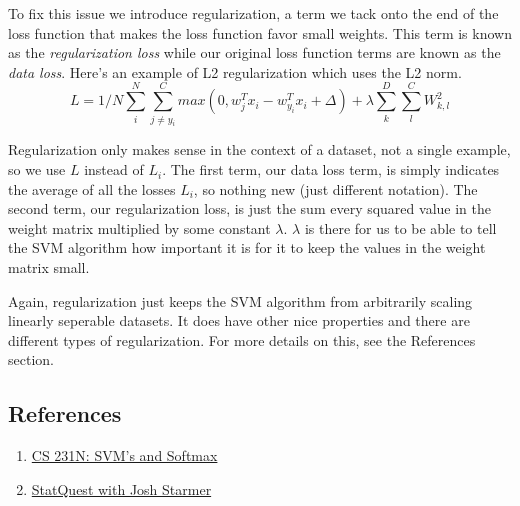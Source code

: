 \documentclass[12pt]{article}
\begin{document}
To fix this issue we introduce regularization, a term we tack onto the end of the loss function
that makes the loss function favor small weights. This term is known as the \emph{regularization 
loss} while our original loss function terms are known as the \emph{data loss}. 
Here's an example of L2 regularization which uses the L2 norm. 
\begin{equation}
    L = 1/N \sum_{i}^N \sum_{j \neq y_{i}}^C max(0, w_{j}^T x_i - w_{y_i}^T x_i + \Delta)
    + \lambda \sum_{k}^D \sum_{l}^C W_{k, l}^2
\end{equation}

Regularization only makes sense in the context of a dataset, not a single example, 
so we use $L$ instead of $L_i$. The first term, our data loss term, is simply indicates the average of all
the losses $L_i$, so nothing new (just different notation). The second term, our 
regularization loss, is just the sum every squared value in the weight matrix multiplied
by some constant $\lambda$. $\lambda$ is there for us to be able to tell the SVM algorithm how 
important it is for it to keep the values in the weight matrix small. 

Again, regularization just keeps the SVM algorithm from arbitrarily scaling linearly seperable datasets. It does
have other nice properties and there are different types of regularization.
For more details on this, see the References section.





\subsection{References}
\begin{enumerate}
    \item \href{https://cs231n.github.io/linear-classify/#svm-vs-softmax}{CS 231N: SVM's and Softmax }
    \item \href{https://www.youtube.com/watch?v=efR1C6CvhmE}{StatQuest with Josh Starmer}
\end{enumerate}
\end{document}
